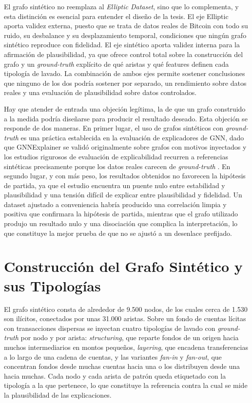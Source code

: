 El grafo sintético no reemplaza al \textit{Elliptic Dataset}, sino que lo complementa, y esta distinción es esencial para entender el diseño de la tesis. El eje Elliptic aporta validez externa, puesto que se trata de datos reales de Bitcoin con todo su ruido, su desbalance y su desplazamiento temporal, condiciones que ningún grafo sintético reproduce con fidelidad. El eje sintético aporta validez interna para la afirmación de plausibilidad, ya que ofrece control total sobre la construcción del grafo y un \textit{ground-truth} explícito de qué aristas y qué features definen cada tipología de lavado. La combinación de ambos ejes permite sostener conclusiones que ninguno de los dos podría sostener por separado, un rendimiento sobre datos reales y una evaluación de plausibilidad sobre datos controlados.

Hay que atender de entrada una objeción legítima, la de que un grafo construido a la medida podría diseñarse para producir el resultado deseado. Esta objeción se responde de dos maneras. En primer lugar, el uso de grafos sintéticos con \textit{ground-truth} es una práctica establecida en la evaluación de explicadores de GNN, dado que GNNExplainer se validó originalmente sobre grafos con motivos inyectados y los estudios rigurosos de evaluación de explicabilidad recurren a referencias sintéticas precisamente porque los datos reales carecen de \textit{ground-truth} \cite{Ying2019Gnnexplainer:Networks, Agarwal2022ProbingMethods}. En segundo lugar, y con más peso, los resultados obtenidos no favorecen la hipótesis de partida, ya que el estudio encuentra un puente nulo entre estabilidad y plausibilidad y una tensión difícil de explicar entre plausibilidad y fidelidad. Un dataset ajustado a conveniencia habría producido una correlación limpia y positiva que confirmara la hipótesis de partida, mientras que el grafo utilizado produjo un resultado nulo y una disociación que complica la interpretación, lo que constituye la mejor prueba de que no se ajustó a un desenlace prefijado.

\section{Construcción del Grafo Sintético y sus Tipologías}

El grafo sintético consta de alrededor de 9.500 nodos, de los cuales cerca de 1.530 son ilícitos, conectados por unas 31.000 aristas. Sobre un fondo de cuentas lícitas con transacciones dispersas se inyectan cuatro tipologías de lavado con \textit{ground-truth} por nodo y por arista: \textit{structuring}, que reparte fondos de un origen hacia muchos intermediarios en montos pequeños, \textit{layering}, que encadena transferencias a lo largo de una cadena de cuentas, y las variantes \textit{fan-in} y \textit{fan-out}, que concentran fondos desde muchas cuentas hacia una o los distribuyen desde una hacia muchas. Cada nodo y cada arista de patrón queda etiquetado con la tipología a la que pertenece, lo que constituye la referencia contra la cual se mide la plausibilidad de las explicaciones.

